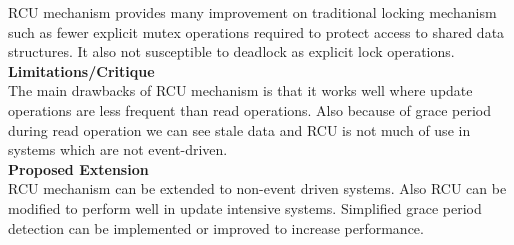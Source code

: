 \documentclass[a4paper, 11pt]{article}
\begin{document}
RCU mechanism provides many improvement on traditional locking mechanism such as fewer explicit mutex operations required to protect access to shared data structures. It also not susceptible to deadlock as explicit lock operations. \\

\noindent
\large\textbf{Limitations/Critique}\\
The main drawbacks of RCU mechanism is that it works well where update operations are less frequent than read operations. Also because of grace period during read operation we can see stale data and RCU is not much of use in systems which are not event-driven.\\ 

\noindent
\large\textbf{Proposed Extension}\\
RCU mechanism can be extended to non-event driven systems. Also RCU can be modified to perform well in update intensive systems. Simplified grace period detection can be implemented or improved to increase performance.
\end{document}
